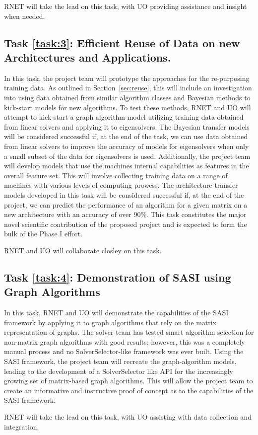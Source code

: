 RNET will take the lead on this task, with UO providing assistance and insight when needed. 


\label{task:3}
\subsection{Task \ref{task:3}: Efficient Reuse of Data on new Architectures and Applications.}
In this task, the project team will prototype the approaches for the re-purposing training data. As outlined in Section~\ref{sec:reuse}, this will include an investigation into using data obtained from similar algorithm classes and Bayesian methods to kick-start models for new algorithms. To test these methods, RNET and UO will attempt to kick-start a graph algorithm model utilizing training data obtained from linear solvers and applying it to eigensolvers. The Bayesian transfer models will be considered successful if, at the end of the task, we can use data obtained from linear solvers to improve the accuracy of models for eigensolvers when only a small subset of the data for eigensolvers is used. 
Additionally, the project team will develop models that use the machines internal capabilities as features in the overall feature set. This will involve collecting training data on a range of machines with various levels of computing prowess. The architecture transfer models developed in this task will be considered successful if, at the end of the project, we can predict the performance of an algorithm for a given matrix on a new architecture with an accuracy of over 90\%. This task constitutes the major novel scientific contribution of the proposed project and is expected to form the bulk of the Phase I effort. 

RNET and UO will collaborate closley on this task. 

\label{task:4}
\subsection{Task \ref{task:4}: Demonstration of SASI using Graph Algorithms }
In this task, RNET and UO will demonstrate the capabilities of the SASI framework by applying 
it to graph algorithms that rely on the matrix representation of graphs. The solver team has tested smart algorithm selection for non-matrix graph algorithms 
with good results; however, this was a completely manual process and no SolverSelector-like framework was ever built. Using 
the SASI framework, the project team will recreate the graph-algorithm models, leading to the development of a SolverSelector
like API for the increasingly growing set of matrix-based graph algorithms.  This will allow the project team to create an informative and instructive proof of concept as to the capabilities of the SASI framework. 

RNET will take the lead on this task, with UO assisting with data collection and integration. 
